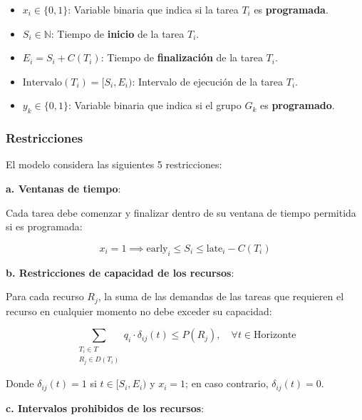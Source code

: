 \documentclass{article}
\begin{document}
\vspace{0.5cm}

\begin{tcolorbox}[colback=gray!5!white, colframe=gray!75!black, title={Variables de decisión}]
    \begin{itemize}
        \item \( x_i \in \{0, 1\} \): Variable binaria que indica si la tarea \( T_i \) es \textbf{programada}.
        \item \( S_i \in \mathbb{N} \): Tiempo de \textbf{inicio} de la tarea \( T_i \).
        \item \( E_i = S_i + C(T_i) \): Tiempo de \textbf{finalización} de la tarea \( T_i \).
        \item \( \text{Intervalo}(T_i) = [S_i, E_i) \): Intervalo de ejecución de la tarea \( T_i \).
        \item \( y_k \in \{0, 1\} \): Variable binaria que indica si el grupo \( G_k \) es \textbf{programado}.
    \end{itemize}
\end{tcolorbox}

\vspace{0.5cm}

\subsubsection{Restricciones}

El modelo considera las siguientes 5 restricciones:

\textbf{a. Ventanas de tiempo}:

Cada tarea debe comenzar y finalizar dentro de su ventana de tiempo permitida si es programada:

\[
x_i = 1 \implies \text{early}_i \leq S_i \leq \text{late}_i - C(T_i)
\]

\textbf{b. Restricciones de capacidad de los recursos}:

Para cada recurso \( R_j \), la suma de las demandas de las tareas que requieren el recurso en cualquier momento no debe exceder su capacidad:

\[
\sum_{\substack{T_i \in T \\ R_j \in D(T_i)}} q_i \cdot \delta_{ij}(t) \leq P(R_j), \quad \forall t \in \text{Horizonte}
\]

Donde \( \delta_{ij}(t) = 1 \) si \( t \in [S_i, E_i) \) y \( x_i = 1 \); en caso contrario, \( \delta_{ij}(t) = 0 \).

\textbf{c. Intervalos prohibidos de los recursos}:
\end{document}
